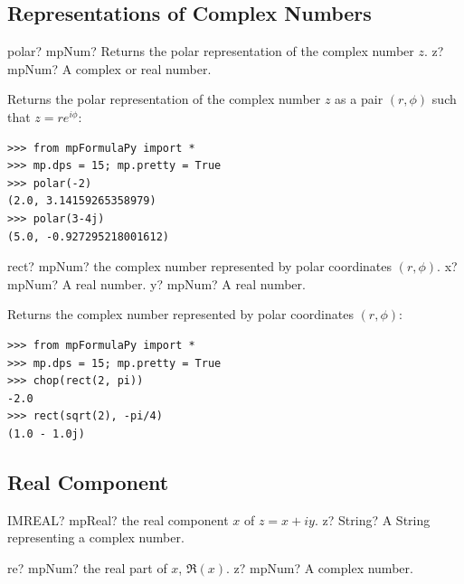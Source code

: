 \subsection{Representations of Complex Numbers}

\begin{mpFunctionsExtract}
	\mpFunctionOne
	{polar? mpNum? Returns the polar representation of the complex number $z$.}
	{z? mpNum? A complex or real number.}
\end{mpFunctionsExtract}


\vpara
Returns the polar representation of the complex number $z$ as a pair $(r,\phi)$ such that $z=r e^{i\phi}$:

\begin{lstlisting}
>>> from mpFormulaPy import *
>>> mp.dps = 15; mp.pretty = True
>>> polar(-2)
(2.0, 3.14159265358979)
>>> polar(3-4j)
(5.0, -0.927295218001612)
\end{lstlisting}



\begin{mpFunctionsExtract}
	\mpFunctionTwo
	{rect? mpNum? the complex number represented by polar coordinates $(r,\phi)$.}
	{x? mpNum? A real number.}
	{y? mpNum? A real number.}
\end{mpFunctionsExtract}



\vpara
Returns the complex number represented by polar coordinates $(r,\phi)$:

\begin{lstlisting}
>>> from mpFormulaPy import *
>>> mp.dps = 15; mp.pretty = True
>>> chop(rect(2, pi))
-2.0
>>> rect(sqrt(2), -pi/4)
(1.0 - 1.0j)
\end{lstlisting}



\subsection{Real Component}

\begin{mpFunctionsExtract}
	\mpWorksheetFunctionOneNotImplemented
	{IMREAL? mpReal? the real component $x$ of $z=x+iy$.}
	{z? String? A String representing a complex number.}
\end{mpFunctionsExtract}

\vspace{0.6cm}

\begin{mpFunctionsExtract}
	\mpFunctionOne
	{re? mpNum? the real part of $x$, $\Re(x)$.}
	{z? mpNum? A complex number.}
\end{mpFunctionsExtract}


